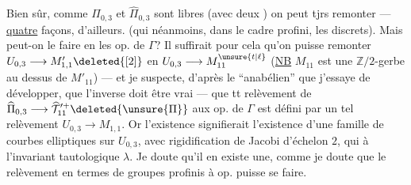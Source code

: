 
Bien sûr, comme $\Pi_{0,3}$ et $\widehat\Pi_{0,3}$ sont libres (avec deux ) on peut tjrs remonter ---  \uline{quatre} façons, d'ailleurs. (qui néanmoins, dans le cadre profini,  les  discrets). Mais peut-on le faire en  les op. de $\Gamma$? Il suffirait pour cela qu'on puisse remonter $U_{0,3}\longrightarrow M'_{1,1}\deleted{[2]}$ en $U_{0,3}\longrightarrow M_{11}^{\unsure{t|\ell}}$ (\uline{NB} $M_{11}$ est une  $\mathbb Z/2$-gerbe au dessus de $M'_{11}$) --- et je suspecte, 
d'après le  ``anabélien'' que j'essaye de développer, que l'inverse doit être vrai --- que tt relèvement de $\widehat\Pi_{0,3}\longrightarrow\widehat{\mathcal T}_{11}^{\prime+}\deleted{\unsure{\Pi}}$  aux op. de $\Gamma$ est défini par un tel relèvement $U_{0,3}\longrightarrow M_{1,1}$. Or l'existence  signifierait  l'existence d'une famille de courbes elliptiques sur $U_{0,3}$, avec
rigidification de Jacobi d'échelon $2$, qui  à l'invariant tautologique $\lambda$. Je doute qu'il en existe une, comme je doute que le relèvement en termes de groupes profinis à op. puisse se faire.

